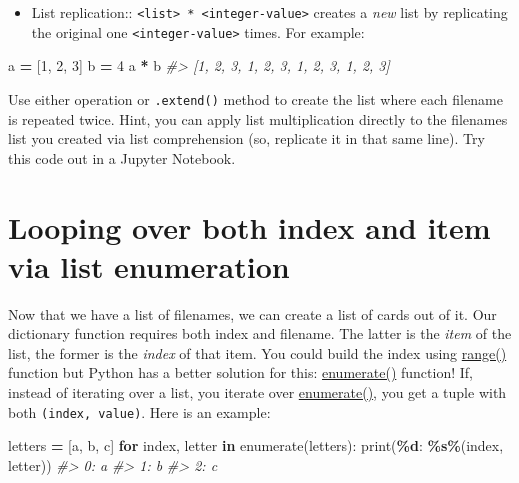 \documentclass[
]{book}
\newenvironment{Shaded}{\begin{snugshade}}{\end{snugshade}}
\newcommand{\BuiltInTok}[1]{#1}
\newcommand{\CommentTok}[1]{\textcolor[rgb]{0.56,0.35,0.01}{\textit{#1}}}
\newcommand{\ControlFlowTok}[1]{\textcolor[rgb]{0.13,0.29,0.53}{\textbf{#1}}}
\newcommand{\DecValTok}[1]{\textcolor[rgb]{0.00,0.00,0.81}{#1}}
\newcommand{\KeywordTok}[1]{\textcolor[rgb]{0.13,0.29,0.53}{\textbf{#1}}}
\newcommand{\NormalTok}[1]{#1}
\newcommand{\OperatorTok}[1]{\textcolor[rgb]{0.81,0.36,0.00}{\textbf{#1}}}
\newcommand{\SpecialCharTok}[1]{\textcolor[rgb]{0.81,0.36,0.00}{\textbf{#1}}}
\newcommand{\StringTok}[1]{\textcolor[rgb]{0.31,0.60,0.02}{#1}}
\providecommand{\tightlist}{%
  \setlength{\itemsep}{0pt}\setlength{\parskip}{0pt}}
\begin{document}
\begin{itemize}
\tightlist
\item
  List replication:: \texttt{\textless{}list\textgreater{}\ *\ \textless{}integer-value\textgreater{}} creates a \emph{new} list by replicating the original one \texttt{\textless{}integer-value\textgreater{}} times. For example:
\end{itemize}

\begin{Shaded}
\begin{Highlighting}[]
\NormalTok{a }\OperatorTok{=}\NormalTok{ [}\DecValTok{1}\NormalTok{, }\DecValTok{2}\NormalTok{, }\DecValTok{3}\NormalTok{]}
\NormalTok{b }\OperatorTok{=} \DecValTok{4}
\NormalTok{a }\OperatorTok{*}\NormalTok{ b}
\CommentTok{\#\textgreater{} [1, 2, 3, 1, 2, 3, 1, 2, 3, 1, 2, 3]}
\end{Highlighting}
\end{Shaded}

Use either operation or \texttt{.extend()} method to create the list where each filename is repeated twice. Hint, you can apply list multiplication directly to the filenames list you created via list comprehension (so, replicate it in that same line). Try this code out in a Jupyter Notebook.

\hypertarget{enumerate}{%
\section{Looping over both index and item via list enumeration}\label{enumerate}}

Now that we have a list of filenames, we can create a list of cards out of it. Our dictionary function requires both index and filename. The latter is the \emph{item} of the list, the former is the \emph{index} of that item. You could build the index using \protect\hyperlink{range}{range()} function but Python has a better solution for this: \href{https://docs.python.org/3/library/functions.html\#enumerate}{enumerate()} function! If, instead of iterating over a list, you iterate over \href{https://docs.python.org/3/library/functions.html\#enumerate}{enumerate()}, you get a tuple with both \texttt{(index,\ value)}. Here is an example:

\begin{Shaded}
\begin{Highlighting}[]
\NormalTok{letters }\OperatorTok{=}\NormalTok{ [}\StringTok{\textquotesingle{}a\textquotesingle{}}\NormalTok{, }\StringTok{\textquotesingle{}b\textquotesingle{}}\NormalTok{, }\StringTok{\textquotesingle{}c\textquotesingle{}}\NormalTok{]}
\ControlFlowTok{for}\NormalTok{ index, letter }\KeywordTok{in} \BuiltInTok{enumerate}\NormalTok{(letters):}
    \BuiltInTok{print}\NormalTok{(}\StringTok{\textquotesingle{}}\SpecialCharTok{\%d}\StringTok{: }\SpecialCharTok{\%s}\StringTok{\textquotesingle{}}\OperatorTok{\%}\NormalTok{(index, letter))}
\CommentTok{\#\textgreater{} 0: a}
\CommentTok{\#\textgreater{} 1: b}
\CommentTok{\#\textgreater{} 2: c}
\end{Highlighting}
\end{Shaded}
\end{document}
